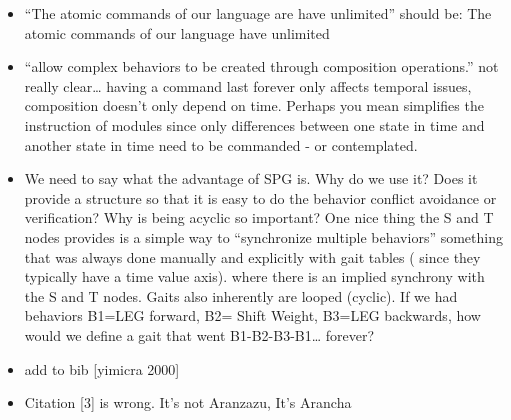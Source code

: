 \documentclass[12pt]{article}
\begin{document}
\begin{itemize}
\item “The atomic commands of our language are have unlimited” should be: The atomic commands of our language have unlimited
\item “allow complex behaviors to be created through composition operations.” not really clear… having a command last forever only affects temporal issues, composition doesn’t only depend on time. Perhaps you mean simplifies the instruction of modules since only differences between one state in time and another state in time need to be commanded - or contemplated.
\item We need to say what the advantage of SPG is. Why do we use it? Does it provide a structure so that it is easy to do the behavior conflict avoidance or verification? Why is being acyclic so important? One nice thing the S and T nodes provides is a simple way to “synchronize multiple behaviors” something that was always done manually and explicitly with gait tables ( since they typically have a time value axis). where there is an implied synchrony with the S and T nodes. Gaits also inherently are looped (cyclic). If we had behaviors B1=LEG forward, B2= Shift Weight, B3=LEG backwards, how would we define a gait that went B1-B2-B3-B1… forever?
\item add to bib [yimicra 2000]
\item Citation [3] is wrong. It’s not Aranzazu, It’s Arancha
\end{itemize}
\end{document}
